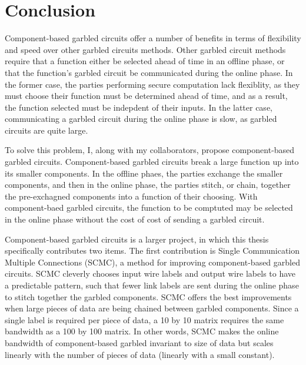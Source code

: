 
\chapter*{Conclusion}
	\setcounter{chapter}{4}
	\setcounter{section}{0}

Component-based garbled circuits offer a number of benefits in terms of flexibility and speed over other garbled circuits methods.
Other garbled circuit methods require that a function either be selected ahead of time in an offline phase, or that the function's garbled circuit be communicated during the online phase.
In the former case, the parties performing secure computation lack flexiblity, as they must choose their function must be determined ahead of time, and as a result, the function selected must be indepdent of their inputs.
In the latter case, communicating a garbled circuit during the online phase is slow, as garbled circuits are quite large.

To solve this problem, I, along with my collaborators, propose component-based garbled circuits.
Component-based garbled circuits break a large function up into its smaller components.
In the offline phaes, the parties exchange the smaller components, and then in the online phase, the parties stitch, or chain, together the pre-exchagned components into a function of their choosing.
With component-baed garbled circuits, the function to be comptuted may be selected in the online phase without the cost of cost of sending a garbled circuit.

Component-based garbled circuits is a larger project, in which this thesis specifically contributes two items.
The first contribution is Single Communication Multiple Connections (SCMC), a method for improving component-based garbled circuits.
SCMC cleverly chooses input wire labels and output wire labels to have a predictable pattern, such that fewer link labels are sent during the online phase to stitch together the garbled components.
SCMC offers the best improvements when large pieces of data are being chained between garbled components.
Since a single label is required per piece of data, a 10 by 10 matrix requires the same bandwidth as a 100 by 100 matrix.
In other words, SCMC makes the online bandwidth of component-based garbled invariant to size of data but scales linearly with the number of pieces of data (linearly with a small constant).

